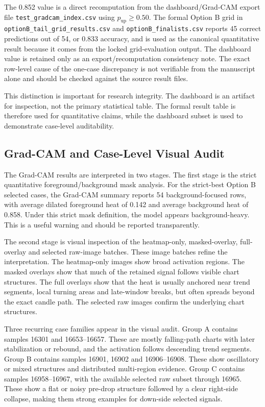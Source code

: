 The 0.852 value is a direct recomputation from the dashboard/Grad-CAM export file \texttt{test\_gradcam\_index.csv} using \(p_{\text{up}} \geq 0.50\). The formal Option B grid in \texttt{optionB\_tail\_grid\_results.csv} and \texttt{optionB\_finalists.csv} reports 45 correct predictions out of 54, or 0.833 accuracy, and is used as the canonical quantitative result because it comes from the locked grid-evaluation output. The dashboard value is retained only as an export/recomputation consistency note. The exact row-level cause of the one-case discrepancy is not verifiable from the manuscript alone and should be checked against the source result files.

This distinction is important for research integrity. The dashboard is an artifact for inspection, not the primary statistical table. The formal result table is therefore used for quantitative claims, while the dashboard subset is used to demonstrate case-level auditability.

\subsection{Grad-CAM and Case-Level Visual Audit}
\label{subsec:xai_results}





The Grad-CAM results are interpreted in two stages. The first stage is the strict quantitative foreground/background mask analysis. For the strict-best Option B selected cases, the Grad-CAM summary reports 54 background-focused rows, with average dilated foreground heat of 0.142 and average background heat of 0.858. Under this strict mask definition, the model appears background-heavy. This is a useful warning and should be reported transparently.

The second stage is visual inspection of the heatmap-only, masked-overlay, full-overlay and selected raw-image batches. These image batches refine the interpretation. The heatmap-only images show broad activation regions. The masked overlays show that much of the retained signal follows visible chart structures. The full overlays show that the heat is usually anchored near trend segments, local turning areas and late-window breaks, but often spreads beyond the exact candle path. The selected raw images confirm the underlying chart structures.

Three recurring case families appear in the visual audit. Group A contains samples 16301 and 16653--16657. These are mostly falling-path charts with later stabilization or rebound, and the activation follows descending trend segments. Group B contains samples 16901, 16902 and 16906--16908. These show oscillatory or mixed structures and distributed multi-region evidence. Group C contains samples 16958--16967, with the available selected raw subset through 16965. These show a flat or noisy pre-drop structure followed by a clear right-side collapse, making them strong examples for down-side selected signals.

